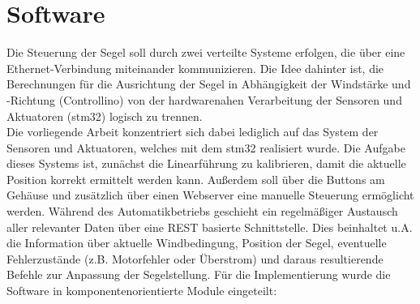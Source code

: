 \section{Software}
Die Steuerung der Segel soll durch zwei verteilte Systeme erfolgen, die über eine Ethernet-Verbindung miteinander kommunizieren. Die Idee dahinter ist, die Berechnungen für die Ausrichtung der Segel in Abhängigkeit der Windstärke und -Richtung (Controllino) von der hardwarenahen Verarbeitung der Sensoren und Aktuatoren (stm32) logisch zu trennen. \\
Die vorliegende Arbeit konzentriert sich dabei lediglich auf das System der Sensoren und Aktuatoren, welches mit dem stm32 realisiert wurde. Die Aufgabe dieses Systems ist, zunächst die Linearführung zu kalibrieren, damit die aktuelle Position korrekt ermittelt werden kann. Außerdem soll über die Buttons am Gehäuse und zusätzlich über einen Webserver eine manuelle Steuerung ermöglicht werden. Während des Automatikbetriebs geschieht ein regelmäßiger Austausch aller relevanter Daten über eine REST basierte Schnittstelle. Dies beinhaltet u.A. die Information über aktuelle Windbedingung, Position der Segel, eventuelle Fehlerzustände (z.B. Motorfehler oder Überstrom) und daraus resultierende Befehle zur Anpassung der Segelstellung.
Für die Implementierung wurde die Software in komponentenorientierte Module eingeteilt:

